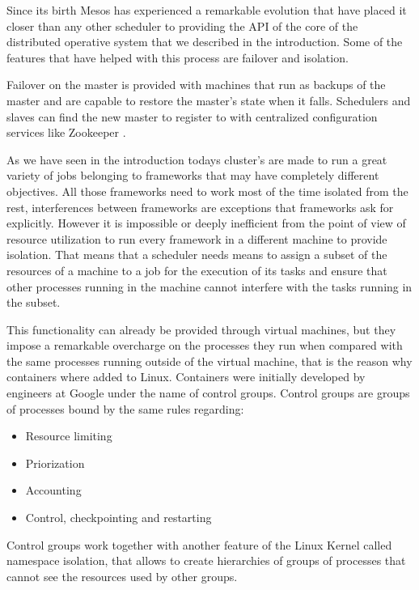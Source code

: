 \documentclass{svjour3}                     %
\begin{document}
Since its birth Mesos has experienced a remarkable evolution that have
placed it closer than any other scheduler to providing the API of the
core of the distributed operative system that we described in the
introduction. Some of the features that have helped with this process
are failover and isolation.

Failover on the master is provided with machines that run as backups of the master and
are capable to restore the master's state when it falls. Schedulers and slaves can find
the new master to register to with centralized configuration services like Zookeeper \cite{_apache_????}.

As we have seen in the introduction todays cluster's are made to run a
great variety of jobs belonging to frameworks that may have completely
different objectives. All those frameworks need to work most of the
time isolated from the rest, interferences between frameworks are
exceptions that frameworks ask for explicitly. However it is
impossible or deeply inefficient from the point of view of resource
utilization to run every framework in a different machine to provide
isolation. That means that a scheduler needs means to assign a subset
of the resources of a machine to a job for the execution of its tasks
and ensure that other processes running in the machine cannot
interfere with the tasks running in the subset.

This functionality can already be provided through virtual machines,
but they impose a remarkable overcharge on the processes they run when
compared with the same processes running outside of the virtual
machine, that is the reason why containers where added to
Linux. Containers were initially developed by engineers at Google
under the name of control groups. Control groups are groups of
processes bound by the same rules regarding: \\

\begin{itemize}
  \item Resource limiting
  \item Priorization
  \item Accounting
  \item Control, checkpointing and restarting
\end{itemize}

Control groups work together with another feature of the Linux Kernel
called namespace isolation, that allows to create hierarchies of
groups of processes that cannot see the resources used by other
groups.
\end{document}
